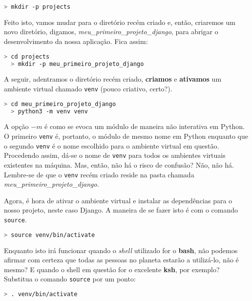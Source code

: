 \begin{lstlisting}[language=bash,caption={Criando o diretório de projetos}]
  > mkdir -p projects
\end{lstlisting}

Feito isto, vamos mudar para o diretório recém criado e, então, criaremos um
novo diretório, digamos, \textit{meu\_primeiro\_projeto\_django}, para abrigar o
desenvolvimento da nossa aplicação. Fica assim:

\begin{lstlisting}[language=bash,caption={Criando o diretório que abrigará nossa aplicação}]
  > cd projects
  > mkdir -p meu_primeiro_projeto_django
\end{lstlisting}

A seguir, adentramos o diretório recém criado, \textbf{criamos} e
\textbf{ativamos} um ambiente virtual chamado \texttt{venv} (pouco criativo,
certo?).

\begin{lstlisting}[language=bash,caption={Criando o ambiente virtual}]
  > cd meu_primeiro_projeto_django
  > python3 -m venv venv
\end{lstlisting}

A opção \(-m\) é como se evoca um módulo de maneira não interativa em Python. O
primeiro \texttt{venv} é, portanto, o módulo de mesmo nome em Python enquanto
que o segundo \texttt{venv} é o nome escolhido para o ambiente virtual em
questão. Procedendo assim, dá-se o nome de \texttt{venv} para todos os ambientes
virtuais existentes na máquina. Mas, então, não há o risco de confusão? Não, não
há. Lembre-se de que o \texttt{venv} recém criado reside na pasta chamada
\textit{meu\_primeiro\_projeto\_django}.

Agora, é hora de ativar o ambiente virtual e instalar as dependências para o
nosso projeto, neste caso Django. A maneira de se fazer isto é com o comando
\texttt{source}.

\begin{lstlisting}[language=bash,caption={Ativando o ambiente virtual -- parte 1}]
  > source venv/bin/activate
\end{lstlisting}

Enquanto isto irá funcionar quando o \textit{shell} utilizado for o
\textbf{bash}, não podemos afirmar com certeza que todas as pessoas no planeta
estarão a utilizá-lo, não é mesmo? E quando o shell em questão for o excelente
\textbf{ksh}, por exemplo? Substitua o comando \texttt{source} por um ponto:

\begin{lstlisting}[language=bash,caption={Ativando o ambiente virtual -- parte 2}]
  > . venv/bin/activate
\end{lstlisting}


